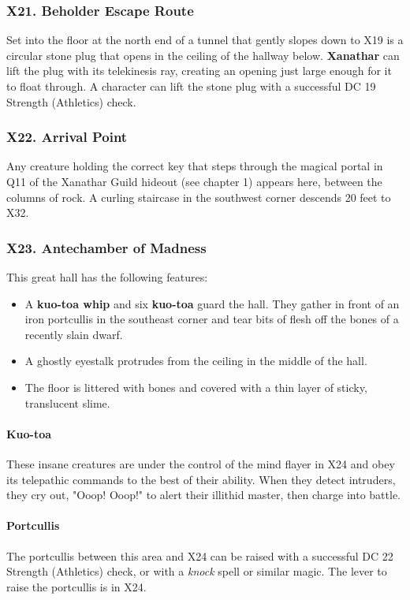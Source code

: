\documentclass[10pt,a4paper,twoside,twocolumn,openany,nodeprecatedcode]{dndbook}
\begin{document}
\subsubsection{X21. Beholder Escape Route}
Set into the floor at the north end of a tunnel that gently slopes down to X19 is a circular stone plug that opens in the ceiling of the hallway below. \textbf{Xanathar} can lift the plug with its telekinesis ray, creating an opening just large enough for it to float through. A character can lift the stone plug with a successful DC 19 Strength (Athletics) check.
\subsubsection{X22. Arrival Point}
Any creature holding the correct key that steps through the magical portal in Q11 of the Xanathar Guild hideout (see chapter 1) appears here, between the columns of rock.
A curling staircase in the southwest corner descends 20 feet to X32.
\subsubsection{X23. Antechamber of Madness}
This great hall has the following features:
\begin{itemize}

\item A \textbf{kuo-toa whip} and six \textbf{kuo-toa} guard the hall. They gather in front of an iron portcullis in the southeast corner and tear bits of flesh off the bones of a recently slain dwarf.
\item A ghostly eyestalk protrudes from the ceiling in the middle of the hall.
\item The floor is littered with bones and covered with a thin layer of sticky, translucent slime.
\end{itemize}


\paragraph{Kuo-toa}
These insane creatures are under the control of the mind flayer in X24 and obey its telepathic commands to the best of their ability. When they detect intruders, they cry out, "Ooop! Ooop!" to alert their illithid master, then charge into battle.
\paragraph{Portcullis}
The portcullis between this area and X24 can be raised with a successful DC 22 Strength (Athletics) check, or with a \textit{knock} spell or similar magic. The lever to raise the portcullis is in X24.
\end{document}
